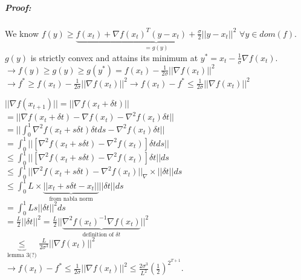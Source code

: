 \documentclass[main]{subfiles}
\begin{document}
\subparagraph{Proof:}
We know $f(y) \geq \underbrace{f(x_t) + \nabla f(x_t)^T(y-x_t) +
\frac{\sigma}{2} ||y - x_t||^2}_{= g(y)}$ $\forall y \in dom(f)$.\\
$g(y)$ is strictly convex and attains its minimum at
$y^* = x_t - \frac{1}{\sigma} \nabla f(x_t)$.\\
$\rightarrow f(y) \geq g(y) \geq g(y^*) = f(x_t) - \frac{1}{2 \sigma}
||\nabla f(x_t)||^2$\\
$\rightarrow f^* \geq f(x_t) - \frac{1}{2 \sigma}||\nabla f(x_t)||^2
\rightarrow f(x_t) - f^* \leq \frac{1}{2 \sigma}||\nabla f(x_t)||^2$

$||\nabla f(x_{t+1})|| = ||\nabla f(x_t + \delta t)||$\\
$= ||\nabla f(x_t + \delta t) - \nabla f(x_t) - \nabla^2 f(x_t) \delta t ||$\\
$= || \int_{0}^{1} \nabla^2 f(x_t + s \delta t) \delta t ds - \nabla^2 f(x_t)
\delta t||$\\
$= \int_{0}^{1} ||[ \nabla^2 f(x_t + s \delta t) - \nabla^2 f(x_t) ] \delta t
ds||$\\
$\leq \int_{0}^{1} ||[\nabla^2 f(x_t + s\delta t) - \nabla^2 f(x_t)] \delta t||
ds$\\
$\leq \int_{0}^{1} ||\nabla^2 f(x_t + s\delta t) - \nabla^2 f(x_t)||_\nabla
\times ||\delta t|| ds$\\
$\leq \int_{0}^{1} L \times \underbrace{||x_t + s\delta t - x_t||}_{\text{from
nabla norm}} || \delta t|| ds$\\
$= \int_0^1 L s ||\delta t||^2 ds$ \\
$= \frac{L}{2} || \delta t||^2 = \frac{L}{2} || \underbrace{\nabla^2
f(x_t)^{-1} \nabla f(x_t)}_{\text{definition of $\delta t$}} ||^2$\\
$\underbrace{\leq}_{\text{lemma 3(?)}} \frac{L}{2 \sigma^3} ||\nabla f(x_t)||^2$\\
$\rightarrow f(x_t) - f^* \leq \frac{1}{2 \sigma} ||\nabla f(x_t)||^2 \leq
\frac{2 \sigma^3}{L^2} (\frac{1}{2})^{2^{T+1}}$.
\end{document}
